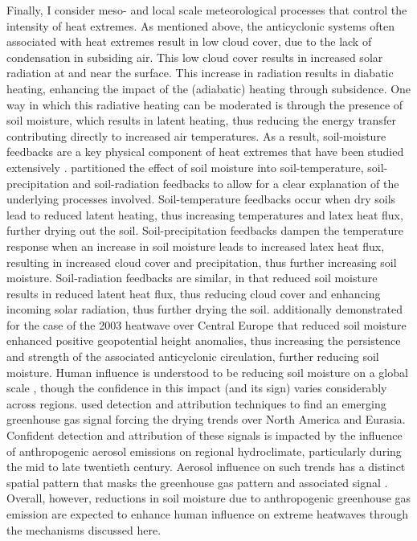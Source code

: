   Finally, I consider meso- and local scale meteorological processes that control the intensity of heat extremes. As mentioned above, the anticyclonic systems often associated with heat extremes result in low cloud cover, due to the lack of condensation in subsiding air. This low cloud cover results in increased solar radiation at and near the surface. This increase in radiation results in diabatic heating, enhancing the impact of the (adiabatic) heating through subsidence. One way in which this radiative heating can be moderated is through the presence of soil moisture, which results in latent heating, thus reducing the energy transfer contributing directly to increased air temperatures. As a result, soil-moisture feedbacks are a key physical component of heat extremes that have been studied extensively \citep{horton_review_2016,wehrli_identifying_2019,zeppetello_physics_2022,vogel_varying_2018,fischer_contribution_2007,fischer_soil_2007,miralles_mega-heatwave_2014,sousa_distinct_2020}. \citet{vogel_varying_2018} partitioned the effect of soil moisture into soil-temperature, soil-precipitation and soil-radiation feedbacks to allow for a clear explanation of the underlying processes involved. Soil-temperature feedbacks occur when dry soils lead to reduced latent heating, thus increasing temperatures and latex heat flux, further drying out the soil. Soil-precipitation feedbacks dampen the temperature response when an increase in soil moisture leads to increased latex heat flux, resulting in increased cloud cover and precipitation, thus further increasing soil moisture. Soil-radiation feedbacks are similar, in that reduced soil moisture results in reduced latent heat flux, thus reducing cloud cover and enhancing incoming solar radiation, thus further drying the soil. \citet{fischer_soil_2007} additionally demonstrated for the case of the 2003 heatwave over Central Europe that reduced soil moisture enhanced positive geopotential height anomalies, thus increasing the persistence and strength of the associated anticyclonic circulation, further reducing soil moisture. Human influence is understood to be reducing soil moisture on a global scale \citep{gu_attribution_2019}, though the confidence in this impact (and its sign) varies considerably across regions. \citet{marvel_twentieth-century_2019} used detection and attribution techniques to find an emerging greenhouse gas signal forcing the drying trends over North America and Eurasia. Confident detection and attribution of these signals is impacted by the influence of anthropogenic aerosol emissions on regional hydroclimate, particularly during the mid to late twentieth century. Aerosol influence on such trends has a distinct spatial pattern that masks the greenhouse gas pattern and associated signal \citep{bonfils_human_2020}. Overall, however, reductions in soil moisture due to anthropogenic greenhouse gas emission are expected to enhance human influence on extreme heatwaves through the mechanisms discussed here.

